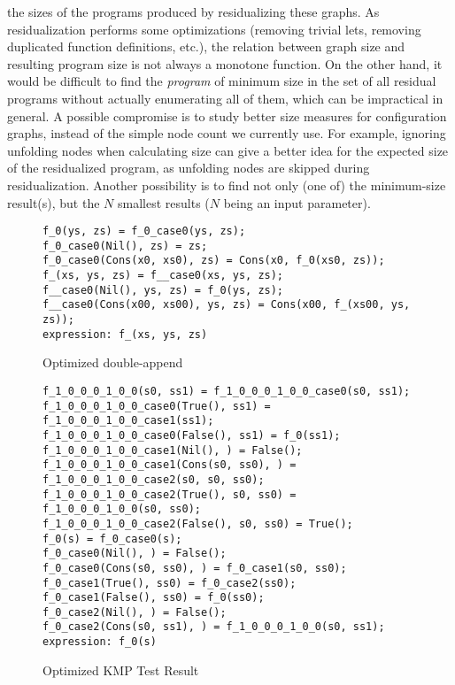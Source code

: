 \documentclass[submission,copyright,creativecommons]{eptcs}
\begin{document}
\begin{itemize}
    the sizes of the programs produced by residualizing these graphs.
    As residualization performs some optimizations (removing trivial lets, removing duplicated
    function definitions, etc.), the relation between graph size and resulting program size
    is not always a monotone function.
    On the other hand, it would be difficult to find the \emph{program} of minimum size
    in the set of all residual programs
    without actually enumerating all of them, which can be impractical in general.
    A possible compromise is to study better size measures for configuration graphs, instead
    of the simple node count we currently use.
    For example, ignoring unfolding nodes when calculating size can give a better idea for the expected size
    of the residualized program, as unfolding nodes are skipped during residualization.
    Another possibility is to find not only (one of) the minimum-size result(s), but the $N$ smallest
    results ($N$ being an input parameter).
    
\end{itemize}

\begin{figure}
\begin{lstlisting}
f_0(ys, zs) = f_0_case0(ys, zs);
f_0_case0(Nil(), zs) = zs;
f_0_case0(Cons(x0, xs0), zs) = Cons(x0, f_0(xs0, zs));
f_(xs, ys, zs) = f__case0(xs, ys, zs);
f__case0(Nil(), ys, zs) = f_0(ys, zs);
f__case0(Cons(x00, xs00), ys, zs) = Cons(x00, f_(xs00, ys, zs));
expression: f_(xs, ys, zs)
\end{lstlisting}
\caption{Optimized double-append}
\label{fig:DoubleAppResult}
\end{figure}

\begin{figure}
\begin{lstlisting}
f_1_0_0_0_1_0_0(s0, ss1) = f_1_0_0_0_1_0_0_case0(s0, ss1);
f_1_0_0_0_1_0_0_case0(True(), ss1) = f_1_0_0_0_1_0_0_case1(ss1);
f_1_0_0_0_1_0_0_case0(False(), ss1) = f_0(ss1);
f_1_0_0_0_1_0_0_case1(Nil(), ) = False();
f_1_0_0_0_1_0_0_case1(Cons(s0, ss0), ) = f_1_0_0_0_1_0_0_case2(s0, s0, ss0);
f_1_0_0_0_1_0_0_case2(True(), s0, ss0) = f_1_0_0_0_1_0_0(s0, ss0);
f_1_0_0_0_1_0_0_case2(False(), s0, ss0) = True();
f_0(s) = f_0_case0(s);
f_0_case0(Nil(), ) = False();
f_0_case0(Cons(s0, ss0), ) = f_0_case1(s0, ss0);
f_0_case1(True(), ss0) = f_0_case2(ss0);
f_0_case1(False(), ss0) = f_0(ss0);
f_0_case2(Nil(), ) = False();
f_0_case2(Cons(s0, ss1), ) = f_1_0_0_0_1_0_0(s0, ss1);
expression: f_0(s)
\end{lstlisting}
\caption{Optimized KMP Test Result}
\label{fig:KMPResult}
\end{figure}
\end{document}

